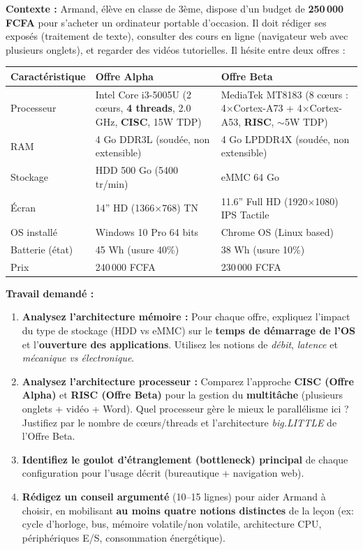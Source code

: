 \documentclass[11pt]{article}
\begin{document}
\begin{exercice}
\textbf{Contexte :} Armand, élève en classe de 3ème, dispose d'un budget de \textbf{250\,000 FCFA} pour s'acheter un ordinateur portable d'occasion. Il doit rédiger ses exposés (traitement de texte), consulter des cours en ligne (navigateur web avec plusieurs onglets), et regarder des vidéos tutorielles. Il hésite entre deux offres :

\begin{center}
\begin{tabularx}{\linewidth}{|l|X|X|}
\hline
\rowcolor{popblueL}
\textbf{Caractéristique} & \textbf{Offre Alpha} & \textbf{Offre Beta} \\
\hline
Processeur & Intel Core i3-5005U (2 cœurs, \textbf{4 threads}, 2.0 GHz, \textbf{CISC}, 15W TDP) & MediaTek MT8183 (8 cœurs : 4$\times$Cortex-A73 + 4$\times$Cortex-A53, \textbf{RISC}, $\sim$5W TDP) \\
\hline
RAM & 4 Go DDR3L (soudée, non extensible) & 4 Go LPDDR4X (soudée, non extensible) \\
\hline
Stockage & HDD 500 Go (5400 tr/min) & eMMC 64 Go \\
\hline
Écran & 14'' HD (1366$\times$768) TN & 11.6'' Full HD (1920$\times$1080) IPS Tactile \\
\hline
OS installé & Windows 10 Pro 64 bits & Chrome OS (Linux based) \\
\hline
Batterie (état) & 45 Wh (usure 40\%) & 38 Wh (usure 10\%) \\
\hline
Prix & 240\,000 FCFA & 230\,000 FCFA \\
\hline
\end{tabularx}
\end{center}

\textbf{Travail demandé :}
\begin{enumerate}
    \item \textbf{Analysez l'architecture mémoire :} Pour chaque offre, expliquez l'impact du type de stockage (HDD vs eMMC) sur le \textbf{temps de démarrage de l'OS} et l'\textbf{ouverture des applications}. Utilisez les notions de \textit{débit}, \textit{latence} et \textit{mécanique vs électronique}.
    \item \textbf{Analysez l'architecture processeur :} Comparez l'approche \textbf{CISC (Offre Alpha)} et \textbf{RISC (Offre Beta)} pour la gestion du \textbf{multitâche} (plusieurs onglets + vidéo + Word). Quel processeur gère le mieux le parallélisme ici ? Justifiez par le nombre de cœurs/threads et l'architecture \textit{big.LITTLE} de l'Offre Beta.
    \item \textbf{Identifiez le goulot d'étranglement (bottleneck) principal} de chaque configuration pour l'usage décrit (bureautique + navigation web).
    \item \textbf{Rédigez un conseil argumenté} (10--15 lignes) pour aider Armand à choisir, en mobilisant \textbf{au moins quatre notions distinctes} de la leçon (ex: cycle d'horloge, bus, mémoire volatile/non volatile, architecture CPU, périphériques E/S, consommation énergétique).
\end{enumerate}
\end{exercice}
\end{document}
